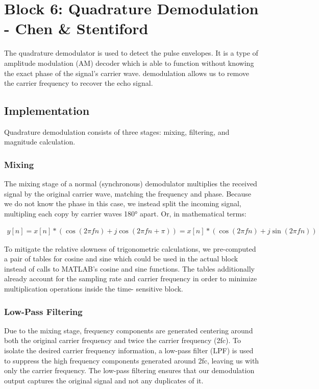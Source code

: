 
\section{Block 6: Quadrature Demodulation - Chen & Stentiford}

The quadrature demodulator is used to detect the pulse envelopes. It is a type of 
amplitude modulation (AM) decoder which is able to function without knowing the exact 
phase of the signal's carrier wave. demodulation allows us to remove the carrier frequency
to recover the echo signal.

\subsection{Implementation}

Quadrature demodulation consists of three stages: mixing, filtering, and magnitude calculation.

\subsubsection{Mixing}

The mixing stage of a normal (synchronous) demodulator multiplies the received signal 
by the original carrier wave, matching the frequency and phase. Because we do not know 
the phase in this case, we instead split the incoming signal, multipling each copy by 
carrier waves 180° apart. Or, in mathematical terms:

\begin{align*}
    y[n] = x[n]*(\cos(2 \pi f n)+j \cos(2 \pi f n+\pi)) = x[n]*(\cos(2 \pi f n)+j \sin(2 \pi f n))
\end{align*}


To mitigate the relative slowness of trigonometric calculations, we pre-computed a pair of 
tables for cosine and sine which could be used in the actual block instead of calls to 
MATLAB's cosine and sine functions. The tables additionally already account for the sampling 
rate and carrier frequency in order to minimize multiplication operations inside the time-
sensitive block.

\subsubsection{Low-Pass Filtering}

Due to the mixing stage, frequency components are generated centering around both the original
carrier frequency and twice the carrier frequency (2fc). To isolate the desired carrier
frequency information, a low-pass filter (LPF) is used to suppress the high frequency components
generated around 2fc, leaving us with only the carrier frequency. The low-pass filtering ensures
that our demodulation output captures the original signal and not any duplicates of it.

